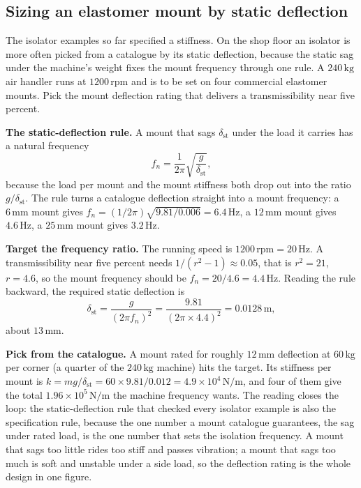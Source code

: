 

\subsection{Sizing an elastomer mount by static deflection}

The isolator examples so far specified a stiffness. On the shop floor an
isolator is more often picked from a catalogue by its static deflection,
because the static sag under the machine's weight fixes the mount
frequency through one rule. A $240\,\si{\kilogram}$ air handler runs at
$1200\,\text{rpm}$ and is to be set on four commercial elastomer mounts.
Pick the mount deflection rating that delivers a transmissibility near
five percent.

\textbf{The static-deflection rule.} A mount that sags $\delta_{\text{
st}}$ under the load it carries has a natural frequency
\[
f_n = \frac{1}{2\pi}\sqrt{\frac{g}{\delta_{\text{st}}}},
\]
because the load per mount and the mount stiffness both drop out into the
ratio $g/\delta_{\text{st}}$. The rule turns a catalogue deflection
straight into a mount frequency: a $6\,\si{\milli\meter}$ mount gives
$f_n = (1/2\pi)\sqrt{9.81/0.006} = 6.4\,\si{\hertz}$, a $12\,\si{\milli
\meter}$ mount gives $4.6\,\si{\hertz}$, a $25\,\si{\milli\meter}$ mount
gives $3.2\,\si{\hertz}$.

\textbf{Target the frequency ratio.} The running speed is $1200\,\text{
rpm} = 20\,\si{\hertz}$. A transmissibility near five percent needs
$1/(r^2 - 1) \approx 0.05$, that is $r^2 = 21$, $r = 4.6$, so the mount
frequency should be $f_n = 20/4.6 = 4.4\,\si{\hertz}$. Reading the rule
backward, the required static deflection is
\[
\delta_{\text{st}} = \frac{g}{(2\pi f_n)^2} = \frac{9.81}{(2\pi\times
4.4)^2} = 0.0128\,\si{\meter},
\]
about $13\,\si{\milli\meter}$.

\textbf{Pick from the catalogue.} A mount rated for roughly $12\,\si{
\milli\meter}$ deflection at $60\,\si{\kilogram}$ per corner (a quarter
of the $240\,\si{\kilogram}$ machine) hits the target. Its stiffness per
mount is $k = mg/\delta_{\text{st}} = 60\times 9.81/0.012 = 4.9\times
10^4\,\si{\newton\per\meter}$, and four of them give the total
$1.96\times 10^5\,\si{\newton\per\meter}$ the machine frequency wants.
The reading closes the loop: the static-deflection rule that checked
every isolator example is also the specification rule, because the one
number a mount catalogue guarantees, the sag under rated load, is the
one number that sets the isolation frequency. A mount that sags too
little rides too stiff and passes vibration; a mount that sags too much
is soft and unstable under a side load, so the deflection rating is the
whole design in one figure.

